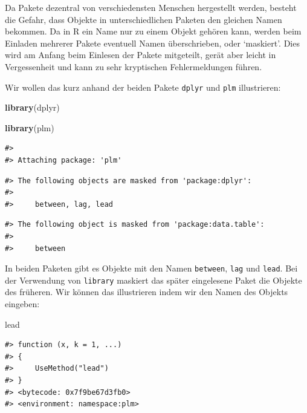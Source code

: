 \documentclass[]{book}
\newenvironment{Shaded}{\begin{snugshade}}{\end{snugshade}}
\newcommand{\KeywordTok}[1]{\textcolor[rgb]{0.13,0.29,0.53}{\textbf{#1}}}
\newcommand{\NormalTok}[1]{#1}
\begin{document}
Da Pakete dezentral von verschiedensten Menschen hergestellt werden,
besteht die Gefahr, dass Objekte in unterschiedlichen Paketen den
gleichen Namen bekommen. Da in R ein Name nur zu einem Objekt gehören
kann, werden beim Einladen mehrerer Pakete eventuell Namen
überschrieben, oder `maskiert'. Dies wird am Anfang beim Einlesen der
Pakete mitgeteilt, gerät aber leicht in Vergessenheit und kann zu sehr
kryptischen Fehlermeldungen führen.

Wir wollen das kurz anhand der beiden Pakete \texttt{dplyr} und
\texttt{plm} illustrieren:

\begin{Shaded}
\begin{Highlighting}[]
\KeywordTok{library}\NormalTok{(dplyr)}
\end{Highlighting}
\end{Shaded}

\begin{Shaded}
\begin{Highlighting}[]
\KeywordTok{library}\NormalTok{(plm)}
\end{Highlighting}
\end{Shaded}

\begin{verbatim}
#> 
#> Attaching package: 'plm'
\end{verbatim}

\begin{verbatim}
#> The following objects are masked from 'package:dplyr':
#> 
#>     between, lag, lead
\end{verbatim}

\begin{verbatim}
#> The following object is masked from 'package:data.table':
#> 
#>     between
\end{verbatim}

In beiden Paketen gibt es Objekte mit den Namen \texttt{between},
\texttt{lag} und \texttt{lead}. Bei der Verwendung von \texttt{library}
maskiert das später eingelesene Paket die Objekte des früheren. Wir
können das illustrieren indem wir den Namen des Objekts eingeben:

\begin{Shaded}
\begin{Highlighting}[]
\NormalTok{lead}
\end{Highlighting}
\end{Shaded}

\begin{verbatim}
#> function (x, k = 1, ...) 
#> {
#>     UseMethod("lead")
#> }
#> <bytecode: 0x7f9be67d3fb0>
#> <environment: namespace:plm>
\end{verbatim}
\end{document}
